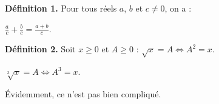 \documentclass[12pt,french]{article}
\begin{document}
\textbf{Définition 1.} Pour tous réels $a$, $b$ et $c \neq 0$, on a :\par
$\frac{a}{c} + \frac b c = \frac{a+b}{c}$. %

\textbf{Définition 2.} Soit $x \geqslant 0$ et $A \geqslant 0$ :
$\sqrt x = A \Leftrightarrow A^2 = x$. %


$\sqrt[3]{x}    =   A \Leftrightarrow A^3 = x$. %

\'Evidemment,
ce
n'est
pas                bien                  compliqué.
\end{document}
